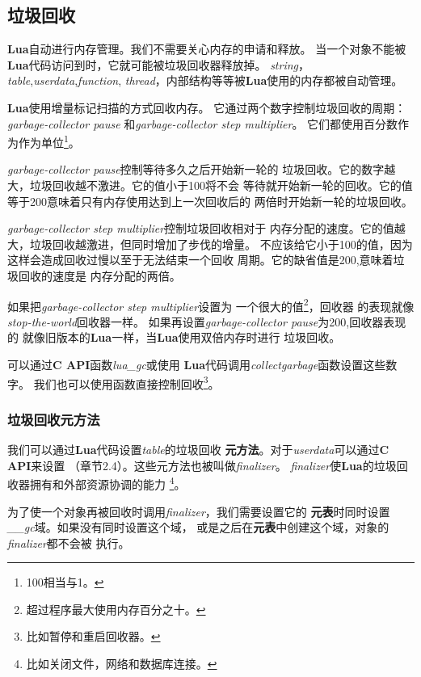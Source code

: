 \documentclass{ctexart}
\begin{document}
\subsection{垃圾回收}

\textbf{Lua}自动进行内存管理。我们不需要关心内存的申请和释放。
当一个对象不能被\textbf{Lua}代码访问到时，它就可能被垃圾回收器释放掉。
\emph{string}，\emph{table},\emph{userdata},\emph{function},
\emph{thread}，内部结构等等被\textbf{Lua}使用的内存都被自动管理。

\textbf{Lua}使用增量标记扫描的方式回收内存。
它通过两个数字控制垃圾回收的周期：\emph{garbage-collector pause}
和\emph{garbage-collector step multiplier}。
它们都使用百分数作为作为单位\footnote{100相当与1。}。

\emph{garbage-collector pause}控制等待多久之后开始新一轮的
垃圾回收。它的数字越大，垃圾回收越不激进。它的值小于100将不会
等待就开始新一轮的回收。它的值等于200意味着只有内存使用达到上一次回收后的
两倍时开始新一轮的垃圾回收。

\emph{garbage-collector step multiplier}控制垃圾回收相对于
内存分配的速度。它的值越大，垃圾回收越激进，但同时增加了步伐的增量。
不应该给它小于100的值，因为这样会造成回收过慢以至于无法结束一个回收
周期。它的缺省值是200,意味着垃圾回收的速度是
内存分配的两倍。

如果把\emph{garbage-collector step multiplier}设置为
一个很大的值\footnote{超过程序最大使用内存百分之十。}，回收器
的表现就像\emph{stop-the-world}回收器一样。
如果再设置\emph{garbage-collector pause}为200,回收器表现的
就像旧版本的\textbf{Lua}一样，当\textbf{Lua}使用双倍内存时进行
垃圾回收。

可以通过\textbf{C API}函数\emph{lua\_gc}或使用
\textbf{Lua}代码调用\emph{collectgarbage}函数设置这些数字。
我们也可以使用函数直接控制回收\footnote{比如暂停和重启回收器。}。

\subsubsection{垃圾回收元方法}

我们可以通过\textbf{Lua}代码设置\emph{table}的垃圾回收
\textbf{元方法}。对于\emph{userdata}可以通过\textbf{C API}来设置
（章节2.4）。这些元方法也被叫做\emph{finalizer}。
\emph{finalizer}使\textbf{Lua}的垃圾回收器拥有和外部资源协调的能力
\footnote{比如关闭文件，网络和数据库连接。}。

为了使一个对象再被回收时调用\emph{finalizer}，我们需要设置它的
\textbf{元表}时同时设置\emph{\_\_gc}域。如果没有同时设置这个域，
或是之后在\textbf{元表}中创建这个域，对象的\emph{finalizer}都不会被
执行。
\end{document}
